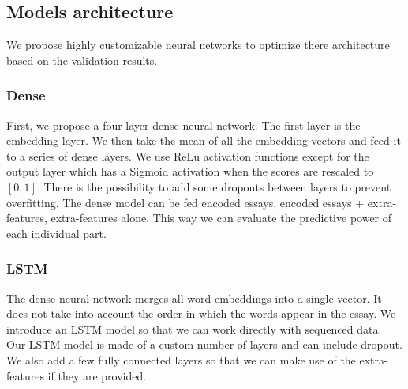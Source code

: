 \documentclass[a4paper,12pt,english]{article}
\begin{document}
\subsection{Models architecture}
We propose highly customizable neural networks to optimize there architecture based on the validation results.
\subsubsection{Dense}
First, we propose a four-layer dense neural network.
The first layer is the embedding layer.
We then take the mean of all the embedding vectors and feed it to a series of dense layers.
We use ReLu activation functions except for the output layer which has a Sigmoid activation when the scores are rescaled to $[0,1]$.
There is the possibility to add some dropouts between layers to prevent overfitting.
The dense model can be fed encoded essays, encoded essays + extra-features, extra-features alone.
This way we can evaluate the predictive power of each individual part.
\subsubsection{LSTM}
The dense neural network merges all word embeddings into a single vector.
It does not take into account the order in which the words appear in the essay.
We introduce an LSTM model so that we can work directly with sequenced data.
Our LSTM model is made of a custom number of layers and can include dropout.
We also add a few fully connected layers so that we can make use of the extra-features if they are provided.
\end{document}

